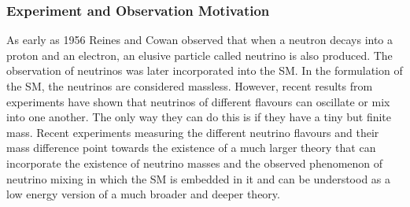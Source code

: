 {\subsubsection{Experiment and Observation Motivation }
As early as 1956 Reines and Cowan\cite{Neutrino} observed that when a neutron decays into a proton and an electron, an elusive particle called neutrino is also produced. The observation of neutrinos was later incorporated into the SM. In the formulation of the SM, the neutrinos are considered massless.
However, recent results from experiments \cite{NeutrinoMix} have shown that neutrinos of different flavours can oscillate or mix into one another. The only way they can do this is if they have a tiny but finite mass. Recent experiments measuring the different neutrino flavours and their mass difference point towards the existence of a much larger theory that can incorporate the existence of neutrino masses and the observed phenomenon of neutrino mixing in which the SM is embedded in it   and can be understood as a low energy version of a much broader and deeper theory.
}

